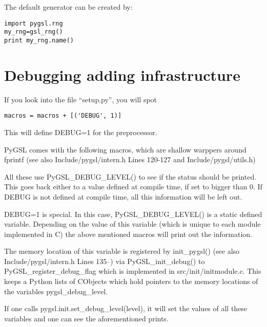 The default generator can be created by:\nopagebreak
\begin{verbatim}
import pygsl.rng
my_rng=gsl_rng()
print my_rng.name()
\end{verbatim}

\section{Debugging adding infrastructure}

If you look into the  file ``setup.py'', you will spot
\begin{verbatim}
macros = macros + [('DEBUG', 1)]
\end{verbatim}

This will define DEBUG=1 for the preprocessor.

PyGSL comes with the following macros, which are shallow warppers around
 fprintf (see also Include/pygsl/intern.h Lines 120-127 and
Include/pygsl/utils.h)


All these use PyGSL_DEBUG_LEVEL() to see if the status should be printed. This goes
back  either to a value defined at compile time, if set to bigger than 0.
If DEBUG is not defined at compile time, all this information will be
left out.

DEBUG=1 is special. In this case, PyGSL_DEBUG_LEVEL() is a static
defined variable. Depending on the value of this variable (which is
unique to each module implemented in C) the above mentioned macros will
print out the information.

The memory location of this variable is registered by init_pygsl() (see
also Include/pygsl/intern.h Lines 135--) via PyGSL_init_debug()
to PyGSL_register_debug_flag which is implemented in
src/init/initmodule.c. This keeps a Python lists of CObjects which hold
pointers to the memory locations of the variables pygsl_debug_level.

If one calls pygsl.init.set_debug_level(level), it will set the values
of all these variables and one can see the aforementioned prints.